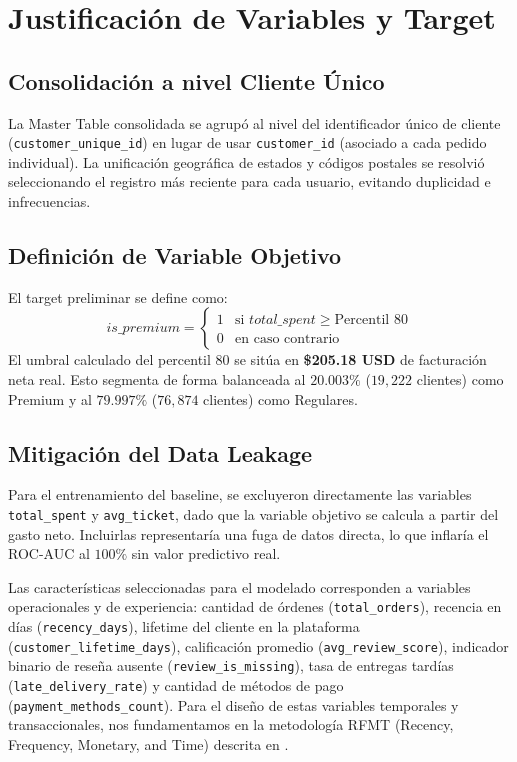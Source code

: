\documentclass[journal,letterpaper]{IEEEtran}
\begin{document}
\section{Justificación de Variables y Target}
\subsection{Consolidación a nivel Cliente Único}
La Master Table consolidada se agrupó al nivel del identificador único de cliente (\texttt{customer\_unique\_id}) en lugar de usar \texttt{customer\_id} (asociado a cada pedido individual). La unificación geográfica de estados y códigos postales se resolvió seleccionando el registro más reciente para cada usuario, evitando duplicidad e infrecuencias.

\subsection{Definición de Variable Objetivo}
El target preliminar se define como:
\begin{equation}
is\_premium = \begin{cases} 
1 & \text{si } total\_spent \geq \text{Percentil 80} \\
0 & \text{en caso contrario}
\end{cases}
\end{equation}
El umbral calculado del percentil 80 se sitúa en \textbf{\$205.18 USD} de facturación neta real. Esto segmenta de forma balanceada al $20.003\%$ ($19,222$ clientes) como Premium y al $79.997\%$ ($76,874$ clientes) como Regulares.

\subsection{Mitigación del Data Leakage}
Para el entrenamiento del baseline, se excluyeron directamente las variables \texttt{total\_spent} y \texttt{avg\_ticket}, dado que la variable objetivo se calcula a partir del gasto neto. Incluirlas representaría una fuga de datos directa, lo que inflaría el ROC-AUC al $100\%$ sin valor predictivo real.

Las características seleccionadas para el modelado corresponden a variables operacionales y de experiencia: cantidad de órdenes (\texttt{total\_orders}), recencia en días (\texttt{recency\_days}), lifetime del cliente en la plataforma (\texttt{customer\_lifetime\_days}), calificación promedio (\texttt{avg\_review\_score}), indicador binario de reseña ausente (\texttt{review\_is\_missing}), tasa de entregas tardías (\texttt{late\_delivery\_rate}) y cantidad de métodos de pago (\texttt{payment\_methods\_count}). Para el diseño de estas variables temporales y transaccionales, nos fundamentamos en la metodología RFMT (Recency, Frequency, Monetary, and Time) descrita en \cite{rfmt_methodology}.
\end{document}
